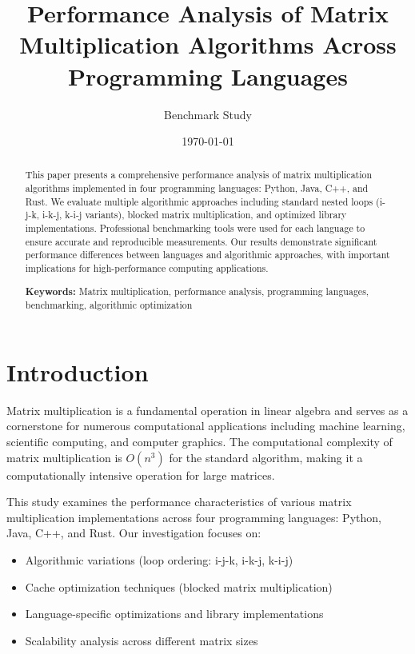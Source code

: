 \documentclass[11pt,a4paper]{article}
\title{Performance Analysis of Matrix Multiplication Algorithms Across Programming Languages}
\author{Benchmark Study}
\date{\today}
\begin{document}
\maketitle

\begin{abstract}
This paper presents a comprehensive performance analysis of matrix multiplication algorithms implemented in four programming languages: Python, Java, C++, and Rust. We evaluate multiple algorithmic approaches including standard nested loops (i-j-k, i-k-j, k-i-j variants), blocked matrix multiplication, and optimized library implementations. Professional benchmarking tools were used for each language to ensure accurate and reproducible measurements. Our results demonstrate significant performance differences between languages and algorithmic approaches, with important implications for high-performance computing applications.

\textbf{Keywords:} Matrix multiplication, performance analysis, programming languages, benchmarking, algorithmic optimization
\end{abstract}

\section{Introduction}

Matrix multiplication is a fundamental operation in linear algebra and serves as a cornerstone for numerous computational applications including machine learning, scientific computing, and computer graphics. The computational complexity of matrix multiplication is $O(n^3)$ for the standard algorithm, making it a computationally intensive operation for large matrices.

This study examines the performance characteristics of various matrix multiplication implementations across four programming languages: Python, Java, C++, and Rust. Our investigation focuses on:

\begin{itemize}
    \item Algorithmic variations (loop ordering: i-j-k, i-k-j, k-i-j)
    \item Cache optimization techniques (blocked matrix multiplication)
    \item Language-specific optimizations and library implementations
    \item Scalability analysis across different matrix sizes
\end{itemize}
\end{document}
